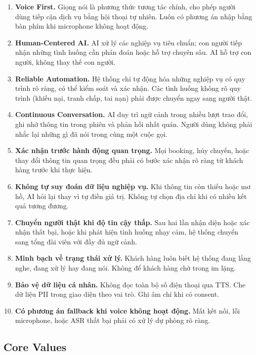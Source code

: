 \documentclass[12pt,a4paper]{article}
\begin{document}
\begin{enumerate}
  \item \textbf{Voice First.} Giọng nói là phương thức tương tác chính, cho phép người dùng tiếp cận dịch vụ bằng hội thoại tự nhiên. Luôn có phương án nhập bằng bàn phím khi microphone không hoạt động.
  \item \textbf{Human-Centered AI.} AI xử lý các nghiệp vụ tiêu chuẩn; con người tiếp nhận những tình huống cần phán đoán hoặc hỗ trợ chuyên sâu. AI hỗ trợ con người, không thay thế con người.
  \item \textbf{Reliable Automation.} Hệ thống chỉ tự động hóa những nghiệp vụ có quy trình rõ ràng, có thể kiểm soát và xác nhận. Các tình huống không rõ quy trình (khiếu nại, tranh chấp, tai nạn) phải được chuyển ngay sang người thật.
  \item \textbf{Continuous Conversation.} AI duy trì ngữ cảnh trong nhiều lượt trao đổi, ghi nhớ thông tin trong phiên và phản hồi nhất quán. Người dùng không phải nhắc lại những gì đã nói trong cùng một cuộc gọi.
  \item \textbf{Xác nhận trước hành động quan trọng.} Mọi booking, hủy chuyến, hoặc thay đổi thông tin quan trọng đều phải có bước xác nhận rõ ràng từ khách hàng trước khi thực hiện.
  \item \textbf{Không tự suy đoán dữ liệu nghiệp vụ.} Khi thông tin còn thiếu hoặc mơ hồ, AI hỏi lại thay vì tự điền giá trị. Không tự chọn địa chỉ khi có nhiều kết quả tương đương.
  \item \textbf{Chuyển người thật khi độ tin cậy thấp.} Sau hai lần nhận diện hoặc xác nhận thất bại, hoặc khi phát hiện tình huống nhạy cảm, hệ thống chuyển sang tổng đài viên với đầy đủ ngữ cảnh.
  \item \textbf{Minh bạch về trạng thái xử lý.} Khách hàng luôn biết hệ thống đang lắng nghe, đang xử lý hay đang nói. Không để khách hàng chờ trong im lặng.
  \item \textbf{Bảo vệ dữ liệu cá nhân.} Không đọc toàn bộ số điện thoại qua TTS. Che dữ liệu PII trong giao diện theo vai trò. Ghi âm chỉ khi có consent.
  \item \textbf{Có phương án fallback khi voice không hoạt động.} Mất kết nối, lỗi microphone, hoặc ASR thất bại phải có xử lý dự phòng rõ ràng.
\end{enumerate}

\subsection{Core Values}
\end{document}
